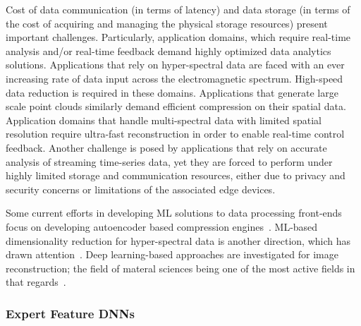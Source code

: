   Cost of data communication (in terms of latency) and data storage (in terms of the cost of acquiring and managing the physical storage resources) present important challenges. Particularly, application domains, which require real-time analysis and/or real-time feedback demand highly optimized data analytics solutions. Applications that rely on hyper-spectral data are faced with an ever increasing rate of data input across the electromagnetic spectrum. High-speed data reduction is required in these domains. Applications that generate large scale point clouds similarly demand efficient compression on their spatial data. Application domains that handle multi-spectral data with limited spatial resolution require ultra-fast reconstruction in order to enable real-time control feedback. Another challenge is posed by applications that rely on accurate analysis of streaming time-series data, yet they are forced to perform under highly limited storage and communication resources, either due to privacy and security concerns or limitations of the associated edge devices.  

    Some current efforts in developing ML solutions to data processing front-ends focus on developing autoencoder based compression engines~\cite{}. ML-based dimensionality reduction for hyper-spectral data is another direction, which has drawn attention~\cite{}. Deep learning-based approaches are investigated for image reconstruction; the field of materal sciences being one of the most active fields in that regards~\cite{Schmidt_nature2019}. 

\subsubsection{Expert Feature DNNs}

